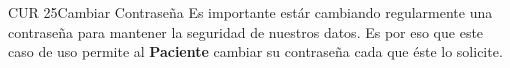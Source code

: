 \begin{UseCase}{CUR 25}{Cambiar Contraseña}
    {
    	Es importante estár cambiando regularmente una contraseña para mantener la seguridad de nuestros datos. Es por eso que este caso de uso permite al \textbf{Paciente} cambiar su contraseña cada que éste lo solicite.
    }


\end{UseCase}
